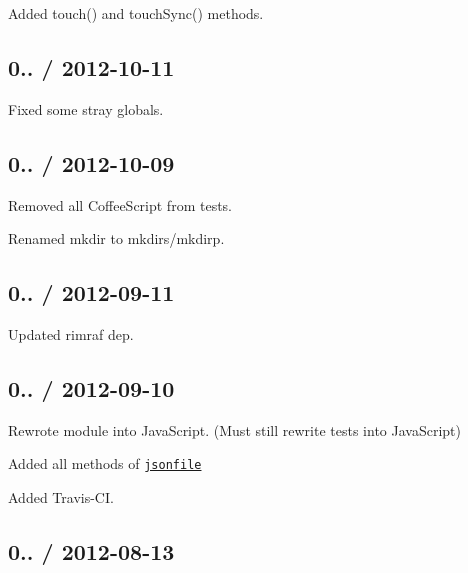 \begin{DoxyItemize}
\item Added {\ttfamily touch()} and {\ttfamily touch\+Sync()} methods.
\end{DoxyItemize}

\subsection*{0.. / 2012-\/10-\/11 }


\begin{DoxyItemize}
\item Fixed some stray globals.
\end{DoxyItemize}

\subsection*{0.. / 2012-\/10-\/09 }


\begin{DoxyItemize}
\item Removed all Coffee\+Script from tests.
\item Renamed {\ttfamily mkdir} to {\ttfamily mkdirs}/{\ttfamily mkdirp}.
\end{DoxyItemize}

\subsection*{0.. / 2012-\/09-\/11 }


\begin{DoxyItemize}
\item Updated {\ttfamily rimraf} dep.
\end{DoxyItemize}

\subsection*{0.. / 2012-\/09-\/10 }


\begin{DoxyItemize}
\item Rewrote module into Java\+Script. (Must still rewrite tests into Java\+Script)
\item Added all methods of \href{https://github.com/jprichardson/node-jsonfile}{\tt jsonfile}
\item Added Travis-\/\+CI.
\end{DoxyItemize}

\subsection*{0.. / 2012-\/08-\/13 }


